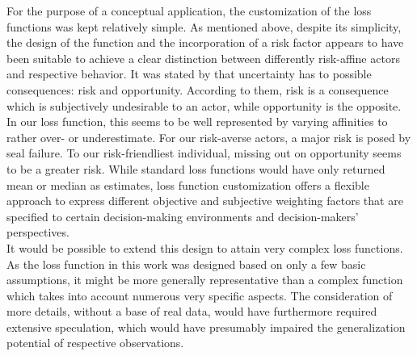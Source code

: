 	For the purpose of a conceptual application, the customization of the loss functions was kept relatively simple. As mentioned above, despite its simplicity, the design of the function and the incorporation of a risk factor appears to have been suitable to achieve a clear distinction between differently risk-affine actors and respective behavior. It was stated by \citet{bratvold2010making} that uncertainty has to possible consequences: risk and opportunity. According to them, risk is a consequence which is subjectively undesirable to an actor, while opportunity is the opposite. In our loss function, this seems to be well represented by varying affinities to rather over- or underestimate. For our risk-averse actors, a major risk is posed by seal failure. To our risk-friendliest individual, missing out on opportunity seems to be a greater risk. While standard loss functions would have only returned mean or median as estimates, loss function customization offers a flexible approach to express different objective and subjective weighting factors that are specified to certain decision-making environments and decision-makers' perspectives.\\
	It would be possible to extend this design to attain very complex loss functions. As the loss function in this work was designed based on only a few basic assumptions, it might be more generally representative than a complex function which takes into account numerous very specific aspects. The consideration of more details, without a base of real data, would have furthermore required extensive speculation, which would have presumably impaired the generalization potential of respective observations.\\
	
